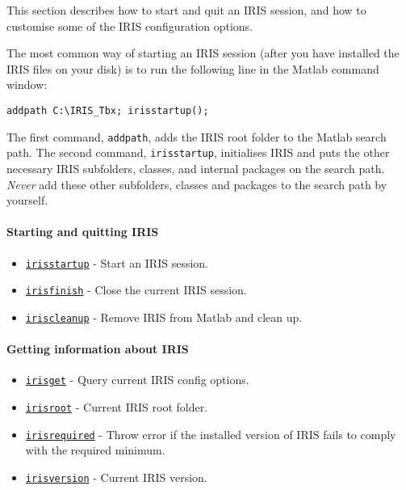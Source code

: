 

	This section describes how to start and quit an IRIS session, and how to
customise some of the IRIS configuration options.

The most common way of starting an IRIS session (after you have
installed the IRIS files on your disk) is to run the following line in
the Matlab command window:

\begin{verbatim}
addpath C:\IRIS_Tbx; irisstartup();
\end{verbatim}

The first command, \texttt{addpath}, adds the IRIS root folder to the
Matlab search path. The second command, \texttt{irisstartup},
initialises IRIS and puts the other necessary IRIS subfolders, classes,
and internal packages on the search path. \emph{Never} add these other
subfolders, classes and packages to the search path by yourself.

\paragraph{Starting and quitting IRIS}\label{starting-and-quitting-iris}

\begin{itemize}
\itemsep1pt\parskip0pt
\item
  \href{config/irisstartup}{\texttt{irisstartup}} - Start an IRIS
  session.
\item
  \href{config/irisfinish}{\texttt{irisfinish}} - Close the current IRIS
  session.
\item
  \href{config/iriscleanup}{\texttt{iriscleanup}} - Remove IRIS from
  Matlab and clean up.
\end{itemize}

\paragraph{Getting information about
IRIS}\label{getting-information-about-iris}

\begin{itemize}
\itemsep1pt\parskip0pt
\item
  \href{config/irisget}{\texttt{irisget}} - Query current IRIS config
  options.
\item
  \href{config/irisroot}{\texttt{irisroot}} - Current IRIS root folder.
\item
  \href{config/irisrequired}{\texttt{irisrequired}} - Throw error if the
  installed version of IRIS fails to comply with the required minimum.
\item
  \href{config/irisversion}{\texttt{irisversion}} - Current IRIS
  version.
\end{itemize}

